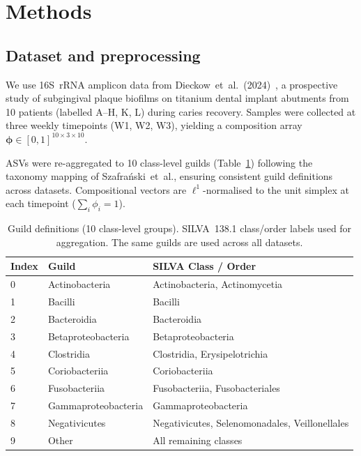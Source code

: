 \documentclass[11pt,a4paper]{article}
\newcommand{\bphi}{\boldsymbol{\phi}}
\begin{document}
\section{Methods}
\label{sec:methods}

\subsection{Dataset and preprocessing}
\label{ssec:data}

We use 16S~rRNA amplicon data from Dieckow~et~al.~(2024)~\citep{dieckow2024},
a prospective study of subgingival plaque biofilms on titanium dental implant
abutments from 10 patients (labelled A--H, K, L) during caries recovery. Samples
were collected at three weekly timepoints (W1, W2, W3), yielding a composition
array $\bphi \in [0,1]^{10 \times 3 \times 10}$.

ASVs were re-aggregated to 10 class-level guilds (Table~\ref{tab:guilds}) following
the taxonomy mapping of Szafra\'{n}ski~et~al., ensuring consistent guild definitions
across datasets. Compositional vectors are $\ell^1$-normalised to the unit simplex
at each timepoint ($\sum_i \phi_i = 1$).

\begin{table}[htb]
\centering
\caption{Guild definitions (10 class-level groups). SILVA~138.1 class/order labels
         used for aggregation. The same guilds are used across all datasets.}
\label{tab:guilds}
\small
\begin{tabular}{lll}
\toprule
\textbf{Index} & \textbf{Guild} & \textbf{SILVA Class / Order} \\
\midrule
0 & Actinobacteria       & Actinobacteria, Actinomycetia \\
1 & Bacilli              & Bacilli \\
2 & Bacteroidia          & Bacteroidia \\
3 & Betaproteobacteria   & Betaproteobacteria \\
4 & Clostridia           & Clostridia, Erysipelotrichia \\
5 & Coriobacteriia       & Coriobacteriia \\
6 & Fusobacteriia        & Fusobacteriia, Fusobacteriales \\
7 & Gammaproteobacteria  & Gammaproteobacteria \\
8 & Negativicutes        & Negativicutes, Selenomonadales, Veillonellales \\
9 & Other                & All remaining classes \\
\bottomrule
\end{tabular}
\end{table}
\end{document}
